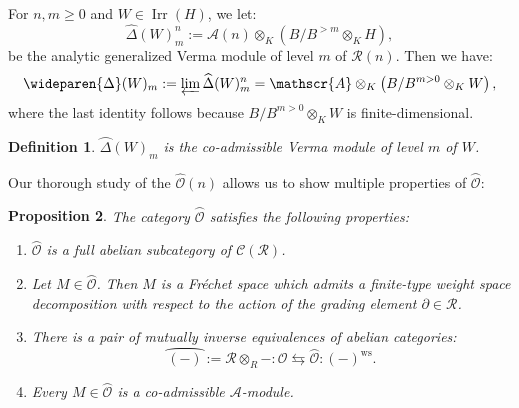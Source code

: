\documentclass{amsart}
\newtheorem{defi}{ Definition}[subsection]
\newtheorem{prop}[defi]{ Proposition}
\newcommand{\OX}{\mathcal{O}}
\begin{document}
For $n,m\geq 0$  and $W\in \operatorname{Irr}(H)$, we let:
\begin{equation*}
    \widehat{\Delta}(W)_m^n:= \mathscr{A}(n)\otimes_K\left(B/B^{>m}\otimes_KH \right),
\end{equation*}
be the analytic generalized Verma module of level $m$ of $\mathscr{R}(n)$. Then we have:
\begin{equation*}
    \wideparen{\Delta}(W)_m:= \varprojlim \widehat{\Delta}(W)_m^n= \mathscr{A}\otimes_K\left(B/B^{m>0}\otimes_K W\right),
\end{equation*}
where the last identity follows because $B/B^{m>0}\otimes_K W$ is finite-dimensional. 
\begin{defi}
$\wideparen{\Delta}(W)_m$ is the co-admissible Verma module of level $m$ of $W$.
\end{defi}
Our thorough study of the $\widehat{\OX}(n)$ allows us to show multiple properties of $\wideparen{\OX}$:
\begin{prop}\label{prop properties of the category O Frechet}
The category $\wideparen{\OX}$ satisfies the following properties:
\begin{enumerate}[label=(\roman*)]
    \item $\wideparen{\OX}$ is a full abelian subcategory of $\mathcal{C}(\mathscr{R})$.
    \item Let $M\in\wideparen{\OX}$. Then $M$ is a Fréchet space which admits a finite-type weight space decomposition with respect to the action of the grading element $\partial \in \mathscr{R}$. 
    \item There is a pair of mutually inverse equivalences of abelian categories:
    \begin{equation*}
   \wideparen{(-)}:=\mathscr{R}\otimes_{R}-:\OX\leftrightarrows \wideparen{\OX}:(-)^{\operatorname{ws}}.
    \end{equation*}
    \item Every $M\in \wideparen{\OX}$ is a co-admissible $\mathscr{A}$-module.
\end{enumerate}
\end{prop}
\end{document}
